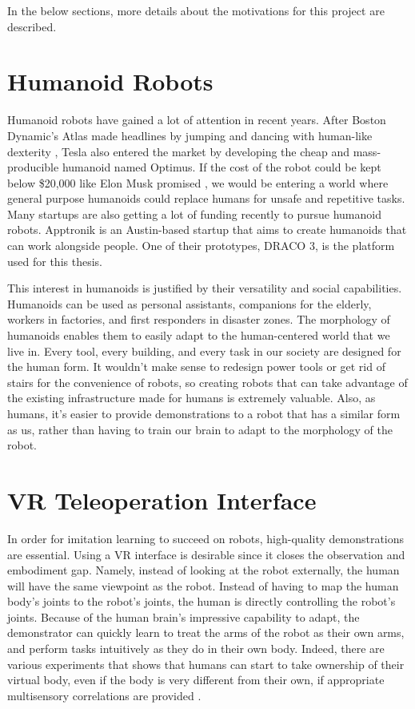 In the below sections, more details about the motivations for this project are described.

\section{Humanoid Robots}
Humanoid robots have gained a lot of attention in recent years. After Boston Dynamic's Atlas made headlines by jumping and dancing with human-like dexterity \cite{atlas}, Tesla also entered the market by developing the cheap and mass-producible humanoid named Optimus. If the cost of the robot could be kept below \$20,000 like Elon Musk promised \cite{teslabot}, we would be entering a world where general purpose humanoids could replace humans for unsafe and repetitive tasks. Many startups are also getting a lot of funding recently to pursue humanoid robots. Apptronik is an Austin-based startup that aims to create humanoids that can work alongside people. One of their prototypes, DRACO 3, is the platform used for this thesis.

This interest in humanoids is justified by their versatility and social capabilities. Humanoids can be used as personal assistants, companions for the elderly, workers in factories, and first responders in disaster zones. The morphology of humanoids enables them to easily adapt to the human-centered world that we live in. Every tool, every building, and every task in our society are designed for the human form. It wouldn't make sense to redesign power tools or get rid of stairs for the convenience of robots, so creating robots that can take advantage of the existing infrastructure made for humans is extremely valuable. Also, as humans, it's easier to provide demonstrations to a robot that has a similar form as us, rather than having to train our brain to adapt to the morphology of the robot.

\section {VR Teleoperation Interface}
In order for imitation learning to succeed on robots, high-quality demonstrations are essential. Using a VR interface is desirable since it closes the observation and embodiment gap. Namely, instead of looking at the robot externally, the human will have the same viewpoint as the robot. Instead of having to map the human body's joints to the robot's joints, the human is directly controlling the robot's joints. Because of the human brain's impressive capability to adapt, the demonstrator can quickly learn to treat the arms of the robot as their own arms, and perform tasks intuitively as they do in their own body. Indeed, there are various experiments that shows that humans can start to take ownership of their virtual body, even if the body is very different from their own, if appropriate multisensory correlations are provided \cite{10.3389/fnhum.2015.00141} \cite{10.3389/neuro.09.006.2008}. 

